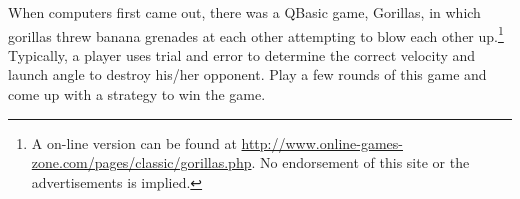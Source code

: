 \begin{pa} \label{PA:9.7.2} When computers first came out, there was a QBasic game, Gorillas, in which gorillas threw banana grenades at each other attempting to blow each other up.\footnote{A on-line version can be found at \url{http://www.online-games-zone.com/pages/classic/gorillas.php}. No endorsement of this site or the advertisements is implied.} Typically, a player uses trial and error to determine the correct velocity and launch angle to destroy his/her opponent. Play a few rounds of this game and come up with a strategy to win the game.

\end{pa} \afterpa 